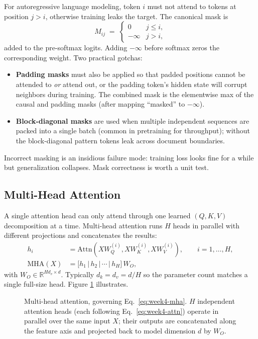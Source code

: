 For autoregressive language modeling, token $i$ must not attend to
tokens at position $j > i$, otherwise training leaks the target.
The canonical mask is
\begin{equation}
M_{ij} \;=\;
\begin{cases}
0            & j \le i, \\
-\infty      & j > i,
\end{cases}
\end{equation}
added to the pre-softmax logits. Adding $-\infty$ before softmax zeros
the corresponding weight. Two practical gotchas:
\begin{itemize}
  \item \textbf{Padding masks} must also be applied so that padded
        positions cannot be attended to \emph{or} attend out, or the
        padding token's hidden state will corrupt neighbors during
        training. The combined mask is the elementwise max of the
        causal and padding masks (after mapping ``masked'' to
        $-\infty$).
  \item \textbf{Block-diagonal masks} are used when multiple
        independent sequences are packed into a single batch (common
        in pretraining for throughput); without the block-diagonal
        pattern tokens leak across document boundaries.
\end{itemize}
Incorrect masking is an insidious failure mode: training loss looks
fine for a while but generalization collapses. Mask correctness is
worth a unit test.

\subsection{Multi-Head Attention}

A single attention head can only attend through one learned
$(Q, K, V)$ decomposition at a time. Multi-head attention
\citep{vaswani2017attention} runs $H$ heads in parallel with different
projections and concatenates the results:
\begin{align}
h_i &= \mathrm{Attn}(X W_Q^{(i)}, X W_K^{(i)}, X W_V^{(i)}),
      \qquad i = 1, \ldots, H, \\
\mathrm{MHA}(X) &= \bigl[h_1 \,|\, h_2 \,|\, \cdots \,|\, h_H\bigr]\, W_O,
\label{eq:week4-mha}
\end{align}
with $W_O \in \mathbb{R}^{H d_v \times d}$. Typically $d_k = d_v = d/H$
so the parameter count matches a single full-size head. Figure
\ref{fig:week4-mha} illustrates.

\begin{figure}[h]
\centering

\caption{Multi-head attention, governing Eq.~\eqref{eq:week4-mha}.
  $H$ independent attention heads (each following
  Eq.~\eqref{eq:week4-attn}) operate in parallel over the same input
  $X$; their outputs are concatenated along the feature axis and
  projected back to model dimension $d$ by $W_O$.}
\label{fig:week4-mha}
\end{figure}

